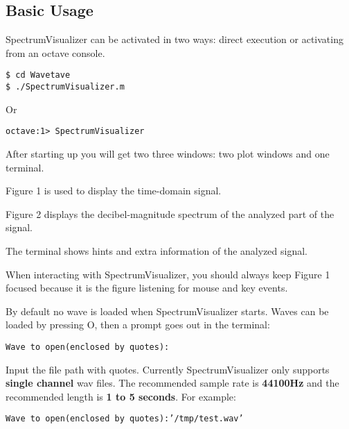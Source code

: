 \subsection{Basic Usage}\indent

        SpectrumVisualizer can be activated in two ways: direct execution or activating from an octave console.
        
        \lstset{language = bash, tabsize = 4}
        \begin{lstlisting}
$ cd Wavetave
$ ./SpectrumVisualizer.m
        \end{lstlisting}
        
        Or
        
        \lstset{language = octave, tabsize = 8}
        \begin{lstlisting}
octave:1> SpectrumVisualizer
        \end{lstlisting}
        
        \bigskip
        
        After starting up you will get two three windows: two plot windows and one terminal.
        
        Figure 1 is used to display the time-domain signal.
        
        Figure 2 displays the decibel-magnitude spectrum of the analyzed part of the signal.
        
        The terminal shows hints and extra information of the analyzed signal.
        
        \newpage
        
        
        When interacting with SpectrumVisualizer, you should always keep Figure 1 focused because it is the figure listening for mouse and key events.
        
        By default no wave is loaded when SpectrumVisualizer starts. Waves can be loaded by pressing O, then a prompt goes out in the terminal:
        
        \bigskip
        \texttt{Wave to open(enclosed by quotes):}
        \bigskip
        
        Input the file path with quotes. Currently SpectrumVisualizer only supports \textbf{single channel} wav files. The recommended sample rate is \textbf{44100Hz} and the recommended length is \textbf{1 to 5 seconds}. For example:
        
        \bigskip
        \texttt{Wave to open(enclosed by quotes):'/tmp/test.wav'}
        \bigskip
        
